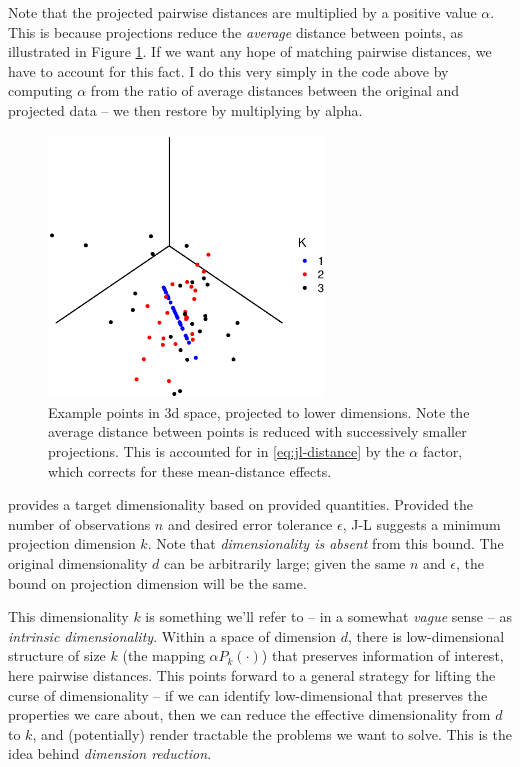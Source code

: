 \documentclass{article}
\begin{document}
Note that the projected pairwise distances are multiplied by a positive value
$\alpha$. This is because projections reduce the \emph{average} distance between
points, as illustrated in Figure \ref{fig:jl-avg-distance}. If we want any hope
of matching pairwise distances, we have to account for this fact. I do this very
simply in the code above by computing $\alpha$ from the ratio of average
distances between the original and projected data -- we then restore by
multiplying by alpha.

\begin{figure}[!ht]
  \centering
  \includegraphics[width=0.65\textwidth]{../../images/dim_proj1}
  \caption{Example points in 3d space, projected to lower dimensions. Note the
    average distance between points is reduced with successively smaller
    projections. This is accounted for in \eqref{eq:jl-distance} by the $\alpha$
    factor, which corrects for these mean-distance effects.}
  \label{fig:jl-avg-distance}
\end{figure}

 provides a target dimensionality based on provided
quantities. Provided the number of observations $n$ and desired error tolerance
$\epsilon$, J-L suggests a minimum projection dimension $k$. Note that
\emph{dimensionality is absent} from this bound. The original dimensionality $d$
can be arbitrarily large; given the same $n$ and $\epsilon$, the bound on
projection dimension will be the same.

This dimensionality $k$ is something we'll refer to -- in a somewhat
\emph{vague} sense -- as \emph{intrinsic dimensionality}. Within a space of
dimension $d$, there is low-dimensional structure of size $k$ (the mapping
$\alpha P_k(\cdot)$) that preserves information of interest, here pairwise
distances. This points forward to a general strategy for lifting the curse of
dimensionality -- if we can identify low-dimensional that preserves the
properties we care about, then we can reduce the effective dimensionality from
$d$ to $k$, and (potentially) render tractable the problems we want to solve.
This is the idea behind \emph{dimension reduction}.
\end{document}
